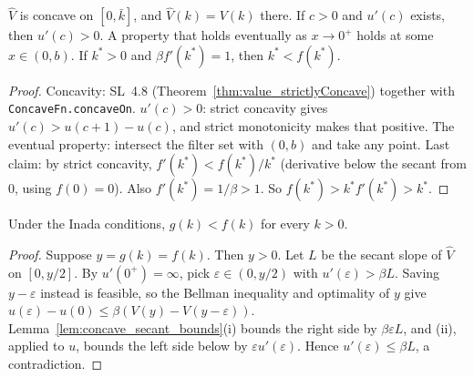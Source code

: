 \begin{lemma}
\label{lem:rck_global_basic}
\leanok
{}
$\hat V$ is concave on $[0,\bar k]$, and $\hat V(k) = V(k)$ there. If $c > 0$ and $u'(c)$ exists, then $u'(c) > 0$.
A property that holds eventually as $x \to 0^+$ holds at some $x \in (0,b)$. If $k^* > 0$ and $\beta f'(k^*) = 1$,
then $k^* < f(k^*)$.
\end{lemma}
\begin{proof}
\leanok
Concavity: SL~4.8 (Theorem~\ref{thm:value_strictlyConcave}) together with \texttt{ConcaveFn.concaveOn}.
$u'(c) > 0$: strict concavity gives $u'(c) > u(c+1) - u(c)$, and strict monotonicity makes that positive.
The eventual property: intersect the filter set with $(0, b)$ and take any point.
Last claim: by strict concavity, $f'(k^*) < f(k^*)/k^*$ (derivative below the secant from $0$, using $f(0)=0$).
Also $f'(k^*) = 1/\beta > 1$. So $f(k^*) > k^* f'(k^*) > k^*$.
\end{proof}

\begin{lemma}
\label{lem:rck_policy_lt_f}
\leanok
{}
Under the Inada conditions, $g(k) < f(k)$ for every $k > 0$.
\end{lemma}
\begin{proof}
\leanok
Suppose $y = g(k) = f(k)$. Then $y > 0$. Let $L$ be the secant slope of $\hat V$ on $[0, y/2]$. By $u'(0^+) = \infty$,
pick $\varepsilon \in (0, y/2)$ with $u'(\varepsilon) > \beta L$. Saving $y - \varepsilon$ instead is feasible, so
the Bellman inequality and optimality of $y$ give $u(\varepsilon) - u(0) \le \beta(V(y) - V(y-\varepsilon))$.
Lemma~\ref{lem:concave_secant_bounds}(i) bounds the right side by $\beta\varepsilon L$, and (ii), applied to $u$,
bounds the left side below by $\varepsilon u'(\varepsilon)$. Hence $u'(\varepsilon) \le \beta L$, a contradiction.
\end{proof}

